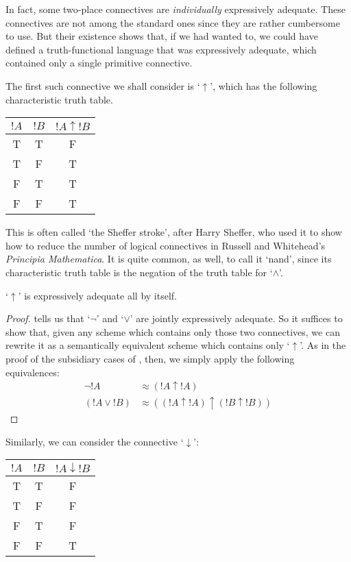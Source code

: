 \documentclass[../../../include/open-logic-section]{subfiles}
\begin{document}
In fact, some two-place connectives are \emph{individually} expressively adequate. These connectives are not among the standard ones since they are rather cumbersome to use. But their existence shows that, if we had wanted to, we could have defined a truth-functional language that was expressively adequate, which contained only a single primitive connective.

The first such connective we shall consider is `$\uparrow$', which has the following characteristic truth table. 
\begin{center}
\begin{tabular}{c c | c}
${!A}$ & ${!B}$ & ${!A} \mathrel{\uparrow} {!B}$\\
\hline
 T & T & F \\
 T & F & T \\
 F & T & T  \\
 F & F & T
\end{tabular}
\end{center}
 This is often called `the Sheffer stroke', after Harry Sheffer, who used it to show how to reduce the number of logical connectives in Russell and Whitehead's \emph{Principia Mathematica}. It is quite common, as well, to call it `nand', since its characteristic truth table is the negation of the truth table for `$\land$'.
\begin{prop}`$\uparrow$' is expressively adequate all by itself. 
	\begin{proof}
		 tells us that `$\lnot$' and `$\lor$' are jointly expressively adequate. So it suffices to show that, given any scheme which contains only those two connectives, we can rewrite it as a semantically equivalent scheme which contains only `$\uparrow$'. As in the proof of the subsidiary cases of , then, we simply apply the following equivalences:
		\begin{align*}
			\lnot {!A} &\approx ({!A} \uparrow {!A})\\
			({!A} \lor {!B}) & \approx (({!A} \uparrow {!A}) \uparrow ({!B} \uparrow {!B}))
		\end{align*}
	\end{proof}
\end{prop}\noindent
Similarly, we can consider the connective `$\downarrow$':
\begin{center}
\begin{tabular}{c c | c}
${!A}$ & ${!B}$ & ${!A} \mathrel{\downarrow} {!B}$\\
\hline
 T & T & F \\
 T & F & F  \\
 F & T & F  \\
 F & F & T
\end{tabular}
\end{center}
\end{document}
